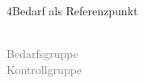 \documentclass[xcolor=table,9pt,aspectratio=169]{beamer}
\begin{document}
\begin{frame}{\vspace*{10mm}4\hspace*{1em}Bedarf als Referenzpunkt}
\begin{multicols}{2}
   \begin{center}
      \\
      \footnotesize{\textcolor{gray}{Bedarfsgruppe}}
      \\
      \footnotesize{\textcolor{gray}{Kontrollgruppe}}
   \end{center}
\end{multicols}
\end{frame}
\end{document}
